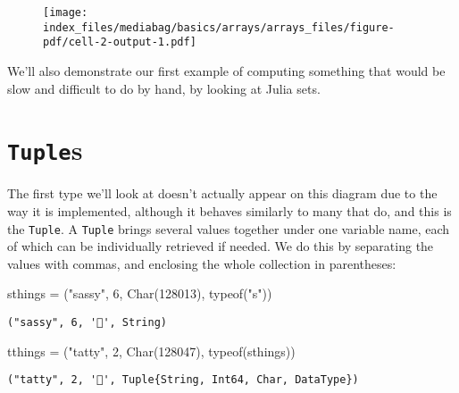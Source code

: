 \documentclass[
  letterpaper,
  DIV=11,
  numbers=noendperiod]{scrreprt}
\newenvironment{Shaded}{\begin{snugshade}}{\end{snugshade}}
\newcommand{\FloatTok}[1]{\textcolor[rgb]{0.68,0.00,0.00}{#1}}
\newcommand{\FunctionTok}[1]{\textcolor[rgb]{0.28,0.35,0.67}{#1}}
\newcommand{\NormalTok}[1]{\textcolor[rgb]{0.00,0.23,0.31}{#1}}
\newcommand{\OperatorTok}[1]{\textcolor[rgb]{0.37,0.37,0.37}{#1}}
\newcommand{\StringTok}[1]{\textcolor[rgb]{0.13,0.47,0.30}{#1}}
\begin{document}
\begin{figure}[H]

{\centering \texttt{[image: index\_files/mediabag/basics/arrays/arrays\_files/figure-pdf/cell-2-output-1.pdf]}

}

\end{figure}

We'll also demonstrate our first example of computing something that
would be slow and difficult to do by hand, by looking at Julia sets.

\hypertarget{tuples}{%
\section{\texorpdfstring{\texttt{Tuple}s}{Tuples}}\label{tuples}}

The first type we'll look at doesn't actually appear on this diagram due
to the way it is implemented, although it behaves similarly to many that
do, and this is the \texttt{Tuple}. A \texttt{Tuple} brings several
values together under one variable name, each of which can be
individually retrieved if needed. We do this by separating the values
with commas, and enclosing the whole collection in parentheses:

\begin{Shaded}
\begin{Highlighting}[]
\NormalTok{sthings }\OperatorTok{=}\NormalTok{ (}\StringTok{"sassy"}\NormalTok{, }\FloatTok{6}\NormalTok{, }\FunctionTok{Char}\NormalTok{(}\FloatTok{128013}\NormalTok{), }\FunctionTok{typeof}\NormalTok{(}\StringTok{"s"}\NormalTok{))}
\end{Highlighting}
\end{Shaded}

\begin{verbatim}
("sassy", 6, '🐍', String)
\end{verbatim}

\begin{Shaded}
\begin{Highlighting}[]
\NormalTok{tthings }\OperatorTok{=}\NormalTok{ (}\StringTok{"tatty"}\NormalTok{, }\FloatTok{2}\NormalTok{, }\FunctionTok{Char}\NormalTok{(}\FloatTok{128047}\NormalTok{), }\FunctionTok{typeof}\NormalTok{(sthings))}
\end{Highlighting}
\end{Shaded}

\begin{verbatim}
("tatty", 2, '🐯', Tuple{String, Int64, Char, DataType})
\end{verbatim}
\end{document}
